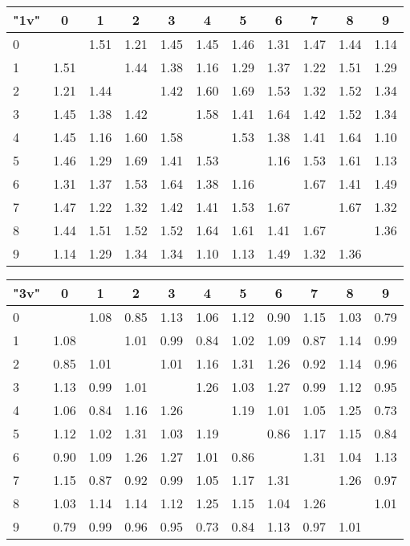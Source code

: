 \begin{table*}
	\centering
	\begin{tabular}{|l||c|c|c|c|c|c|c|c|c|c|}\hline
		{\bf "1v"} & 0 & 1 & 2 & 3 & 4 & 5 & 6 & 7 & 8 & 9 \\\hline\hline
0 & &1.51 &1.21 &1.45 &1.45 &1.46 &1.31 &1.47 &1.44 &1.14  \\\hline
1 &1.51 & &1.44 &1.38 &1.16 &1.29 &1.37 &1.22 &1.51 &1.29  \\\hline
2 &1.21 &1.44 & &1.42 &1.60 &1.69 &1.53 &1.32 &1.52 &1.34  \\\hline
3 &1.45 &1.38 &1.42 & &1.58 &1.41 &1.64 &1.42 &1.52 &1.34  \\\hline
4 &1.45 &1.16 &1.60 &1.58 & &1.53 &1.38 &1.41 &1.64 &1.10  \\\hline
5 &1.46 &1.29 &1.69 &1.41 &1.53 & &1.16 &1.53 &1.61 &1.13  \\\hline
6 &1.31 &1.37 &1.53 &1.64 &1.38 &1.16 & &1.67 &1.41 &1.49  \\\hline
7 &1.47 &1.22 &1.32 &1.42 &1.41 &1.53 &1.67 & &1.67 &1.32  \\\hline
8 &1.44 &1.51 &1.52 &1.52 &1.64 &1.61 &1.41 &1.67 & &1.36  \\\hline
9 &1.14 &1.29 &1.34 &1.34 &1.10 &1.13 &1.49 &1.32 &1.36 &  \\\hline
	\end{tabular}

	\vspace{0.3cm}
	
	\begin{tabular}{|l||c|c|c|c|c|c|c|c|c|c|}\hline
		{\bf "3v"} & 0 & 1 & 2 & 3 & 4 & 5 & 6 & 7 & 8 & 9 \\\hline\hline
0 & &1.08 &0.85 &1.13 &1.06 &1.12 &0.90 &1.15 &1.03 &0.79  \\\hline
1 &1.08 & &1.01 &0.99 &0.84 &1.02 &1.09 &0.87 &1.14 &0.99  \\\hline
2 &0.85 &1.01 & &1.01 &1.16 &1.31 &1.26 &0.92 &1.14 &0.96  \\\hline
3 &1.13 &0.99 &1.01 & &1.26 &1.03 &1.27 &0.99 &1.12 &0.95  \\\hline
4 &1.06 &0.84 &1.16 &1.26 & &1.19 &1.01 &1.05 &1.25 &0.73  \\\hline
5 &1.12 &1.02 &1.31 &1.03 &1.19 & &0.86 &1.17 &1.15 &0.84  \\\hline
6 &0.90 &1.09 &1.26 &1.27 &1.01 &0.86 & &1.31 &1.04 &1.13  \\\hline
7 &1.15 &0.87 &0.92 &0.99 &1.05 &1.17 &1.31 & &1.26 &0.97  \\\hline
8 &1.03 &1.14 &1.14 &1.12 &1.25 &1.15 &1.04 &1.26 & &1.01  \\\hline
9 &0.79 &0.99 &0.96 &0.95 &0.73 &0.84 &1.13 &0.97 &1.01 &  \\\hline 
	\end{tabular}
	

\end{table*}
